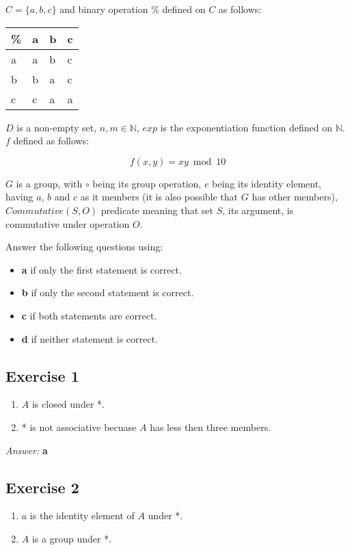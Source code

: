\documentclass[11pt]{article}
\begin{document}
$C = \{a, b, c\}$  and binary operation \% defined on $C$ as follows:

\begin{center}
\begin{tabular}{llll}
\% & a & b & c\\
\hline
a & a & b & c\\
b & b & a & c\\
c & c & a & a\\
\end{tabular}
\end{center}

$D$ is a non-empty set, $n, m \in \mathbb{N}$, $exp$ is the exponentiation function
defined on $\mathbb{N}$. $f$ defined as follows:

\begin{equation}
f(x, y) = xy \bmod 10
\end{equation}

$G$ is a group, with $\circ$ being its group operation, $e$ being its identity
element, having $a$, $b$ and $c$ as it members (it is also possible that $G$
has other members), $Commutative(S, O)$ predicate meaning that set $S$, its argument,
is commutative under operation $O$.

Answer the following questions using:

\begin{itemize}
\item \textbf{a} if only the first statement is correct.
\item \textbf{b} if only the second statement is correct.
\item \textbf{c} if both statements are correct.
\item \textbf{d} if neither statement is correct.
\end{itemize}

\subsection{Exercise 1}
\label{sec-2-1}
\begin{enumerate}
\item $A$ is closed under *.
\item * is not associative becuase $A$ has less then three members.
\end{enumerate}

\emph{Answer:} \textbf{a}
\subsection{Exercise 2}
\label{sec-2-2}
\begin{enumerate}
\item $a$ is the identity element of $A$ under *.
\item $A$ is a group under *.
\end{enumerate}
\end{document}
